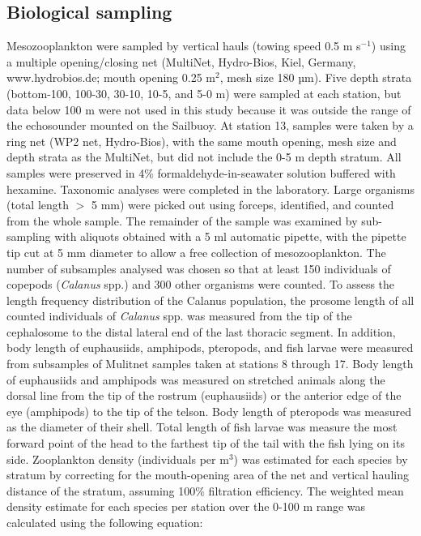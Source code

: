 \subsection{Biological sampling}
Mesozooplankton were sampled by vertical hauls (towing speed 0.5 m s$^{-1}$) using a multiple opening/closing net (MultiNet, Hydro-Bios, Kiel, Germany, www.hydrobios.de; mouth opening 0.25 m$^{2}$, mesh size 180 µm). Five depth strata (bottom-100, 100-30, 30-10, 10-5, and 5-0 m) were sampled at each station, but data below 100 m were not used in this study because it was outside the range of the echosounder mounted on the Sailbuoy. At station 13, samples were taken by a ring net (WP2 net, Hydro-Bios), with the same mouth opening, mesh size and depth strata as the MultiNet, but did not include the 0-5 m depth stratum. All samples were preserved in 4\% formaldehyde-in-seawater solution buffered with hexamine. Taxonomic analyses were completed in the laboratory. Large organisms (total length $>$ 5 mm) were picked out using forceps, identified, and counted from the whole sample. The remainder of the sample was examined by sub-sampling with aliquots obtained with a 5 ml automatic pipette, with the pipette tip cut at 5 mm diameter to allow a free collection of mesozooplankton. The number of subsamples analysed was chosen so that at least 150 individuals of copepods (\textit{Calanus} spp.) and 300 other organisms were counted. To assess the length frequency distribution of the Calanus population, the prosome length of all counted individuals of \textit{Calanus} spp. was measured from the tip of the cephalosome to the distal lateral end of the last thoracic segment. In addition, body length of euphausiids, amphipods, pteropods, and fish larvae were measured from subsamples of Mulitnet samples taken at stations 8 through 17. Body length of euphausiids and amphipods was measured on stretched animals along the dorsal line from the tip of the rostrum (euphausiids) or the anterior edge of the eye (amphipods) to the tip of the telson. Body length of pteropods was measured as the diameter of their shell. Total length of fish larvae was measure the most forward point of the head to the farthest tip of the tail with the fish lying on its side. Zooplankton density (individuals per m$^3$) was estimated for each species by stratum by correcting for the mouth-opening area of the net and vertical hauling distance of the stratum, assuming 100\% filtration efficiency. The weighted mean density estimate for each species per station over the 0-100 m range was calculated using the following equation:

